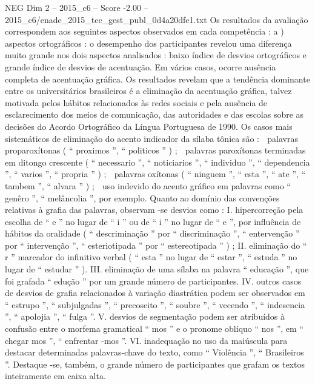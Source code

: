\begin{textsample}{NEG Dim 2 – 2015\_c6 – Score -2.00 – 2015\_c6/enade\_2015\_tec\_gest\_publ\_0d4a20dfe1.txt}
Os resultados da avaliação correspondem aos seguintes aspectos observados em cada competência : a ) aspectos ortográficos : o desempenho dos participantes revelou uma diferença muito grande nos dois aspectos analisados : baixo índice de desvios ortográficos e grande índice de desvios de acentuação.
Em vários casos, ocorre ausência completa de acentuação gráfica.
Os resultados revelam que a tendência dominante entre os universitários brasileiros é a eliminação da acentuação gráfica, talvez motivada pelos hábitos relacionados às redes sociais e pela ausência de esclarecimento dos meios de comunicação, das autoridades e das escolas sobre as decisões do Acordo Ortográfico da Língua Portuguesa de 1990.
Os casos mais sistemáticos de eliminação do acento indicador da sílaba tônica são :  palavras proparoxítonas ( “ proximos ”, “ politicos ” ) ;  palavras paroxítonas terminadas em ditongo crescente ( “ necessario ”, “ noticiarios ”, “ individuo ”, “ dependencia ”, “ varios ”, “ propria ” ) ;  palavras oxítonas ( “ ninguem ”, “ esta ”, “ ate ”, “ tambem ”, “ alvara ” ) ;  uso indevido do acento gráfico em palavras como “ genêro ”, “ melâncolia ”, por exemplo.
Quanto ao domínio das convenções relativas à grafia das palavras, observam -se desvios como : I. hipercorreção pela escolha de “ e ” no lugar de “ i ” ou de “ i ” no lugar de “ e ”, por influência de hábitos da oralidade ( “ descriminação ” por “ discriminação ”, “ entervenção ” por “ intervenção ”, “ esteriotipada ” por “ estereotipada ” ) ; II. eliminação do “ r ” marcador do infinitivo verbal ( “ esta ” no lugar de “ estar ”, “ estuda ” no lugar de “ estudar ” ).
III. eliminação de uma sílaba na palavra “ educação ”, que foi grafada “ edução ” por um grande número de participantes.
IV. outros casos de desvios de grafia relacionados à variação diastrática podem ser observados em “ estrupo ”, “ subjulgadas ”, “ precoseito ”, “ soubre ”, “ vecendo ”, “ indesencia ”, “ apolojia ”, “ fulga ”.
V. desvios de segmentação podem ser atribuídos à confusão entre o morfema gramatical “ mos ” e o pronome oblíquo “ nos ”, em “ chegar mos ”, “ enfrentar -mos ”.
VI. inadequação no uso da maiúscula para destacar determinadas palavras-chave do texto, como “ Violência ”, “ Brasileiros ”.
Destaque -se, também, o grande número de participantes que grafam os textos inteiramente em caixa alta.

\end{textsample}
